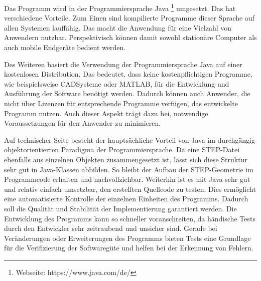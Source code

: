 Das Programm wird in der Programmiersprache Java \footnote{Webseite: https://www.java.com/de/} umgesetzt. Das hat verschiedene Vorteile. Zum Einen sind kompilierte Programme dieser Sprache auf allen Systemen lauffähig. Das macht die Anwendung für eine Vielzahl von Anwendern nutzbar. Perspektivisch können damit sowohl stationäre Computer als auch mobile Endgeräte bedient werden.

Des Weiteren basiert die Verwendung der Programmiersprache Java auf einer kostenlosen Distribution. Das bedeutet, dass keine kostenpflichtigen Programme, wie beispielsweise CAD\-Sys\-teme oder MATLAB, für die Entwicklung und Ausführung der Software benötigt werden. Dadurch können auch Anwender, die nicht über Lizenzen für entsprechende Programme verfügen, das entwickelte Programm nutzen. Auch dieser Aspekt trägt dazu bei, notwendige Voraussetzungen für den Anwender zu minimieren.

Auf technischer Seite besteht der hauptsächliche Vorteil von Java im durchgängig objektorientierten Paradigma der Programmiersprache. Da eine STEP-Datei ebenfalls aus einzelnen Objekten zusammengesetzt ist, lässt sich diese Struktur sehr gut in Java-Klassen abbilden. So bleibt der Aufbau der STEP-Geometrie im Programmcode erhalten und nachvollziehbar. 
Weiterhin ist es mit Java sehr gut und relativ einfach umsetzbar, den erstellten Quellcode zu testen. Dies ermöglicht eine automatisierte Kontrolle der einzelnen Einheiten des Programms. Dadurch soll die Qualität und Stabilität der Implementierung garantiert werden. Die Entwicklung des Programms kann so schneller voranschreiten, da händische Tests durch den Entwickler sehr zeitraubend und unsicher sind. Gerade bei Veränderungen oder Erweiterungen des Programms bieten Tests eine Grundlage für die Verifizierung der Softwaregüte und helfen bei der Erkennung von Fehlern.     




       
 